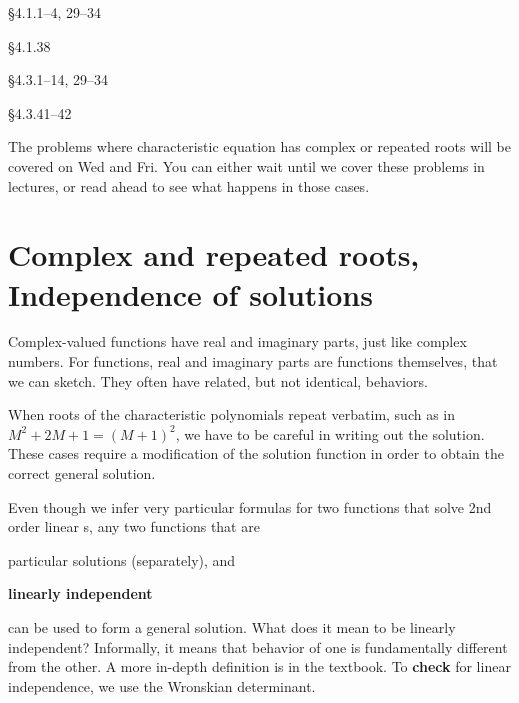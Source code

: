 \begin{colenumerate}
\item {} \S 4.1.1--4, 29--34
\item {} \S 4.1.38
\item {} \S 4.3.1--14, 29--34
\item {} \S 4.3.41--42
\end{colenumerate}
The problems where characteristic equation has complex or repeated roots will be covered on Wed and Fri. You can either wait until we cover these problems in lectures, or read ahead to see what happens in those cases.










\section{Complex and repeated roots,  Independence of solutions}

\begin{weekintro}
  Complex-valued functions have real and imaginary parts, just like complex numbers. For functions, real and imaginary parts are functions themselves, that we can sketch. They often have related, but not identical, behaviors. 

  When roots of the characteristic polynomials repeat verbatim, such as in \(M^{2} + 2M + 1 = (M+1)^{2}\), we have to be careful in writing out the solution. These cases require a modification of the solution function in order to obtain the correct general solution.

  Even though we infer very particular formulas for two functions that solve 2nd order linear \ode{}s, any two functions that are
  \begin{compactenum}[(i)]
    \item particular solutions (separately), and
    \item \textbf{linearly independent} 
  \end{compactenum}
  can be used to form a general solution. What does it mean to be linearly independent? Informally, it means that behavior of one is fundamentally different from the other. A more in-depth definition is in the textbook. To \textbf{check} for linear independence, we use the Wronskian determinant.
\end{weekintro}

